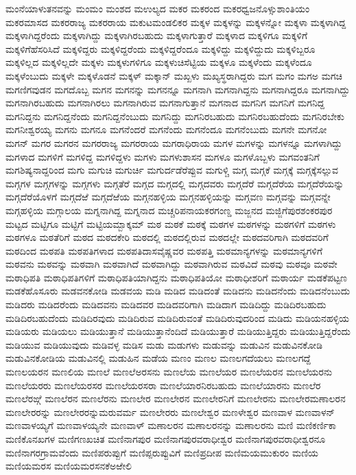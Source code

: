 {ಮಂನೆಯಾಳುತನವನ್ನು
ಮಂಮಂ
ಮಂಶದ
ಮಉಲ್ಯದ
ಮಕರ
ಮಕರಂದ
ಮಕರಧ್ವಜನೊಳ್ಸುಶಾಂತಿಯಂ
ಮಕರಮಾಸದ
ಮಕರರಾಜ್ಯ
ಮಕರರಾಯ
ಮಕುಟಮಂಡಲಿಕರ
ಮಕ್ಕಳ
ಮಕ್ಕಳನ್ನು
ಮಕ್ಕಳನ್ನೋ
ಮಕ್ಕಳಾ
ಮಕ್ಕಳಾಗಿದ್ದ
ಮಕ್ಕಳಾಗಿದ್ದರೆಂದು
ಮಕ್ಕಳಾಗಿದ್ದು
ಮಕ್ಕಳಾಗಿರಬಹುದು
ಮಕ್ಕಳಾಗುತ್ತಾರೆ
ಮಕ್ಕಳಾದ
ಮಕ್ಕಳಿಗೂ
ಮಕ್ಕಳಿಗೆ
ಮಕ್ಕಳಿಗೆಹೆಸರಿಸಿದೆ
ಮಕ್ಕಳಿದ್ದರು
ಮಕ್ಕಳಿದ್ದರೆಂದು
ಮಕ್ಕಳಿದ್ದರೆಂದೂ
ಮಕ್ಕಳಿದ್ದು
ಮಕ್ಕಳಿದ್ದುದು
ಮಕ್ಕಳಿಬ್ಬರೂ
ಮಕ್ಕಳಿಲ್ಲದ
ಮಕ್ಕಳಿಲ್ಲದೇ
ಮಕ್ಕಳು
ಮಕ್ಕಳುಗಳಿಗೂ
ಮಕ್ಕಳುಚಿಸೆಟ್ಟಿಯ
ಮಕ್ಕಳೂ
ಮಕ್ಕಳೆಂದು
ಮಕ್ಕಳೆಂದೂ
ಮಕ್ಕಳೆಂಬುದು
ಮಕ್ಕಳೇ
ಮಕ್ಕಳೊಡನೆ
ಮಕ್ಕಳ್
ಮಕ್ಕಾನ್
ಮಖ್ಖಳು
ಮಖ್ಯಸ್ಥರಾಗಿದ್ದರು
ಮಗ
ಮಗಂ
ಮಗಅ
ಮಗಚಿ
ಮಗಣಿಗವುಡನ
ಮಗದೊಬ್ಬ
ಮಗನ
ಮಗನನ್ನು
ಮಗನನ್ನೂ
ಮಗನಾಗಿ
ಮಗನಾಗಿದ್ದನು
ಮಗನಾಗಿದ್ದರೂ
ಮಗನಾಗಿದ್ದು
ಮಗನಾಗಿರಬಹುದು
ಮಗನಾಗಿರಲು
ಮಗನಾಗಿರುವ
ಮಗನಾಗುತ್ತಾನೆ
ಮಗನಾದ
ಮಗನಿಗ
ಮಗನಿಗೆ
ಮಗನಿದ್ದ
ಮಗನಿದ್ದನು
ಮಗನಿದ್ದನೆಂದು
ಮಗನಿದ್ದನೆಂಬುದು
ಮಗನಿದ್ದು
ಮಗನಿರಬಹುದು
ಮಗನಿರಬಹುದೆಂದು
ಮಗನಿರಬೇಕು
ಮಗನೀಶ್ವರಯ್ಯ
ಮಗನು
ಮಗನೂ
ಮಗನೆಂದರೆ
ಮಗನೆಂದು
ಮಗನೆಂದೂ
ಮಗನೆಂಬುದು
ಮಗನೇ
ಮಗನೋ
ಮಗನ್
ಮಗರ
ಮಗರನ
ಮಗರರಾಜ್ಯ
ಮಗರರಾಯ
ಮಗರಾಧಿರಾಯ
ಮಗಳ
ಮಗಳನ್ನು
ಮಗಳನ್ನೂ
ಮಗಳಾಗಿದ್ದು
ಮಗಳಾದ
ಮಗಳಿಗೆ
ಮಗಳಿದ್ದ
ಮಗಳಿದ್ದಳು
ಮಗಳು
ಮಗಳುಶಾಸನ
ಮಗಳೂ
ಮಗಳೊಬ್ಬಳು
ಮಗವಂತನಿಗೆ
ಮಗಶಿಷ್ಯನಾದ್ದರಿಂದ
ಮಗು
ಮಗುಚಿ
ಮಗುರ್ಚಿ
ಮಗುರ್ದಡೆರೆಪ್ಪುವ
ಮಗುಳ್ಚಿ
ಮಗ್ಗ
ಮಗ್ಗಕೆ
ಮಗ್ಗಕ್ಕೆ
ಮಗ್ಗಕ್ಕೆಸಲ್ಲುವ
ಮಗ್ಗಗಳ
ಮಗ್ಗಗಳನ್ನು
ಮಗ್ಗಗಳು
ಮಗ್ಗತೆರೆ
ಮಗ್ಗದ
ಮಗ್ಗದಲ್ಲಿ
ಮಗ್ಗದವರು
ಮಗ್ಗದೆರೆ
ಮಗ್ಗದೆರೆಯ
ಮಗ್ಗದೆರೆಯನ್ನು
ಮಗ್ಗದೆರೆಯೊಳಗೆ
ಮಗ್ಗದೆಱೆ
ಮಗ್ಗದೆಱೆಯ
ಮಗ್ಗನಹಳ್ಳಿಯ
ಮಗ್ಗನಹಳ್ಳಿಯನ್ನು
ಮಗ್ಗವಣ
ಮಗ್ಗವನ್ನು
ಮಗ್ಗವನ್ನೇ
ಮಗ್ಗಹಳ್ಳಿಯ
ಮಗ್ಗಾಲಯ
ಮಗ್ನನಾಗಿದ್ದ
ಮಗ್ನನಾದ
ಮಚ್ಚರಿಪನಾಯಕರಗಂಣ್ಡ
ಮಜ್ಜನದ
ಮಜ್ಜಿಗೆಪುರಶಂಕರಪುರ
ಮಟ್ಟದ
ಮಟ್ಟಿಗೂ
ಮಟ್ಟಿಗೆ
ಮಟ್ಟಿಯಮ್ಬಾಕ್ಕಮ್
ಮಠ
ಮಠಕೆ
ಮಠಕ್ಕೆ
ಮಠಗಳ
ಮಠಗಳನ್ನು
ಮಠಗಳಿಗೆ
ಮಠಗಳು
ಮಠಗಳೂ
ಮಠತೆರಿಗೆ
ಮಠದ
ಮಠದಕೇರಿ
ಮಠದಲ್ಲಿ
ಮಠದಲ್ಲಿರುವ
ಮಠದಲ್ಲೇ
ಮಠದವರಿಗಾಗಿ
ಮಠದವರಿಗೆ
ಮಠದಿಂದ
ಮಠಪತಿ
ಮಠಪತಿಗಳಾದ
ಮಠಪತಿದಾಸವೈಷ್ಣವರ
ಮಠಪತ್ತಿ
ಮಠಮಾನ್ಯಗಳನ್ನು
ಮಠಮಾನ್ಯಗಳಿಗೆ
ಮಠವನು
ಮಠವನ್ನು
ಮಠವಾಗಿ
ಮಠವಾಗಿದೆ
ಮಠವಾಗಿದ್ದು
ಮಠವಾಗಿರುವ
ಮಠವಿದೆ
ಮಠವು
ಮಠವೂ
ಮಠವೇ
ಮಠಾಧಿಪತಿ
ಮಠಾಧಿಪತಿಗಳಿಗೆ
ಮಠಾಧಿಪತಿಯಾಗಿದ್ದನು
ಮಠಾಧಿಪತಿಯೋ
ಮಠಾಧೀಶರಿಗೆ
ಮಠಾರ್ಯ
ಮಡಕೆಪಟ್ಟಣ
ಮಡಕೆಹೊಸೂರು
ಮಡವನಕೋಡಿ
ಮಡವಯ
ಮಡಿ
ಮಡಿದ
ಮಡಿದಂತೆ
ಮಡಿದನು
ಮಡಿದನೆಂದು
ಮಡಿದನೆಂಬುದು
ಮಡಿದರು
ಮಡಿದರೆಂದು
ಮಡಿದವನು
ಮಡಿದವರ
ಮಡಿದವರಿಗಾಗಿ
ಮಡಿದಾಗ
ಮಡಿದಿದ್ದು
ಮಡಿದಿರಬಹುದು
ಮಡಿದಿರಬಹುದೆಂದು
ಮಡಿದಿರವುದು
ಮಡಿದಿರುವ
ಮಡಿದಿರುವಂತೆ
ಮಡಿದಿರುವುದರಿಂದ
ಮಡಿದು
ಮಡಿಯನಹಳ್ಳಿಯ
ಮಡಿಯರು
ಮಡಿಯಲು
ಮಡಿಯುತ್ತಾನೆ
ಮಡಿಯುತ್ತಾನೆಂದಿದೆ
ಮಡಿಯುತ್ತಾರೆ
ಮಡಿಯುತ್ತಿದ್ದರು
ಮಡಿಯುತ್ತಿದ್ದರೆಂದು
ಮಡಿಯುವ
ಮಡಿಯುವುದು
ಮಡಿವಳ್ಳ
ಮಡಿಸ
ಮಡು
ಮಡುಗಳು
ಮಡುವನ್ನು
ಮಡುವಿನ
ಮಡುವಿನಕೋಡಿ
ಮಡುವಿನಕೋಡಿಯ
ಮಡುವಿನಲ್ಲಿ
ಮಡುಹಿನ
ಮಡೆಯ
ಮಣಂ
ಮಣಲ
ಮಣಲಗದೆಯಲು
ಮಣಲಗದ್ದೆ
ಮಣಲಯರನ
ಮಣಲಿಯ
ಮಣಲೆ
ಮಣಲೆಅರಸನು
ಮಣಲೆಯ
ಮಣಲೆಯರ
ಮಣಲೆಯರನ
ಮಣಲೆಯರನು
ಮಣಲೆಯರರು
ಮಣಲೆಯರಸರ
ಮಣಲೆಯರಸರಾ
ಮಣಲೆಯಾರನಿರಬಹುದು
ಮಣಲೆಯಾರನು
ಮಣಲೆರ
ಮಣಲೆರಙ್ಗೆ
ಮಣಲೆರನ
ಮಣಲೆರನು
ಮಣಲೇರ
ಮಣಲೇರನ
ಮಣಲೇರನಿಗೆ
ಮಣಲೇರನು
ಮಣಲೇರಮಣಾಲರನ
ಮಣಲೇರರನ್ನು
ಮಣಲೇರರನ್ನುಮರುವರ್ಮ
ಮಣಲೇರರು
ಮಣಲೇಶ್ವರ
ಮಣಳೇಶ್ವರ
ಮಣವಾಳ
ಮಣವಾಳನ್
ಮಣವಾಳಯ್ಯಗೆ
ಮಣವಾಳಯ್ಯನೇ
ಮಣವಾಳ್
ಮಣಾಲರನ
ಮಣಾಲರನನ್ನು
ಮಣಾಲರನು
ಮಣಿ
ಮಣಿಕರ್ಣಿಕಾ
ಮಣಿಕೊನಖಗಳ
ಮಣಿಗಣಖಚಿತ
ಮಣಿನಾಗಪುರ
ಮಣಿನಾಗಪುರವರಾಧೀಶ್ವರ
ಮಣಿನಾಗಪುರವರಾಧೀಶ್ವರನೂ
ಮಣಿನಾಗರಗ್ರಾಮವೆಂದು
ಮಣಿಪರುಪ್ಪುಗೆ
ಮಣಿಪ್ಪರುಪ್ಪುವಿಗೆ
ಮಣಿಪ್ರದೀಪ
ಮಣಿಮಯಮುಕುರಂ
ಮಣಿಯ
ಮಣಿಯಮರಸ
ಮಣಿಯಮರಸನಕೆಅಱೇಲಿ
}
